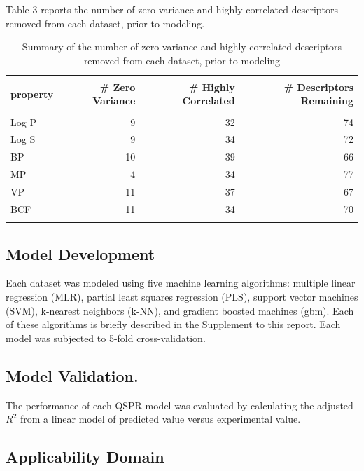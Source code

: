 \documentclass[10pt, letter]{article}
\renewcommand{\=}{\, =\, }
\newcommand{\+}{\, +\, }
\renewcommand{\-}{\, -\, }
\begin{document}
Table 3 reports the number of zero variance and highly correlated descriptors removed from each dataset, prior to modeling.

\begin{table}[H]
\begin{center}
\begin{tabular}{lrrr}
\toprule
&&\\
{\bf property} & {\bf  \# Zero Variance} & {\bf \# Highly Correlated} & {\bf \# Descriptors Remaining}\\
\midrule
&&\\
Log P  &  9 & 32 & 74\\
Log S  &  9 & 34 & 72\\
BP  &  10 & 39 & 66\\
MP  & 4 & 34 & 77\\
VP  & 11 & 37 & 67\\
BCF  & 11 & 34 & 70\\
&&\\
\bottomrule
\end{tabular}
\end{center}
\caption{Summary of the number of zero variance and highly correlated descriptors removed from each dataset, prior to modeling}
\end{table}

\subsection{Model Development}

Each dataset was modeled using five machine learning algorithms: multiple linear regression (MLR), partial least squares regression (PLS), support vector machines (SVM), k-nearest neighbors (k-NN), and gradient boosted machines (gbm). Each of these algorithms is briefly described in the Supplement to this report. Each model was subjected to 5-fold cross-validation.

\subsection{Model Validation.} The performance of each QSPR model
was evaluated by calculating the adjusted \( R^2\) from a linear model of predicted value versus experimental value.

\subsection{Applicability Domain}
\end{document}
